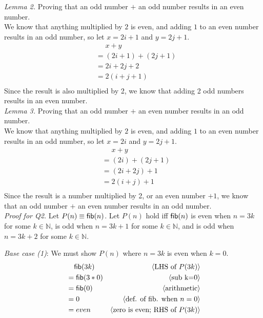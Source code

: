 \documentclass[11pt,fleqn]{article}
\newcommand{\mname}[1]{\mbox{\sf #1}}
\newcommand{\pnote}[1]{{\langle \text{#1} \rangle}}
\begin{document}
\begin{enumerate}
  \emph{Lemma 2.} Proving that an odd number $+$ an odd number results in an even number.\\
  We know that anything multiplied by $2$ is even, and adding $1$ to an even number results in an odd number, so let $x=2i+1$ and $y=2j+1$.\\
  \begin{align*}
    &\phantom{{}=} x+y\\
    &= (2i+1)+(2j+1)\\
    &= 2i+2j+2\\
    &= 2(i+j+1)\\
  \end{align*}
  Since the result is also multiplied by 2, we know that adding 2 odd numbers results in an even number.\\

  \emph{Lemma 3.} Proving that an odd number $+$ an even number results in an odd number.\\
  We know that anything multiplied by $2$ is even, and adding $1$ to an even number results in an odd number, so let $x=2i$ and $y=2j+1$.\\
  \begin{align*}
    &\phantom{{}=} x+y\\
    &= (2i)+(2j+1)\\
    &= (2i+2j)+1\\
    &= 2(i+j)+1\\
  \end{align*}
  Since the result is a number multiplied by 2, or an even number $+ 1$, we know that an odd number $+$ an even number results in an odd number.\\

  \emph{Proof for Q2.} Let $P(n) \equiv \mname{fib}(n)$. Let $P(n)$ hold iff $\mname{fib}(n)$ is even when $n = 3k$ for some $k \in \mathbb{N}$, is odd when $n = 3k + 1$ for some $k \in \mathbb{N}$, and is odd when $n = 3k + 2$ for some $k \in \mathbb{N}$.
  
    \medskip

  \emph{Base case (1)}: We must show $P(n)$ where $n=3k$ is even when $k=0$.
  \begin{align*}
    &\phantom{{}=} \mname{fib}(3k) & \pnote{LHS of $P(3k)$}\\
    &= \mname{fib}(3*0)  & \pnote{sub k=0}\\
    &= \mname{fib}(0) & \pnote{arithmetic}\\
    &= 0 & \pnote{def. of fib. when $n=0$}\\
    &= even    & \pnote{zero is even; RHS of $P(3k)$}\\
  \end{align*}


\end{enumerate}
\end{document}
